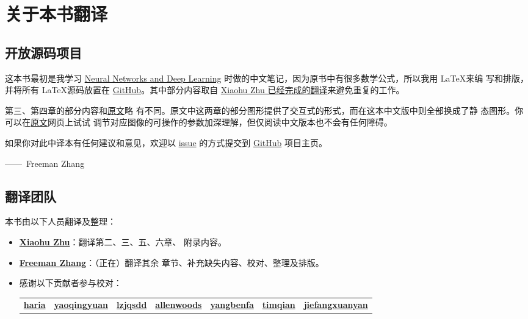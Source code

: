 
\chapter{关于本书翻译}
\label{ch:TranslationTeam}

\section*{开放源码项目}

这本书最初是我学习
\href{http://neuralnetworksanddeeplearning.com/index.html}{Neural Networks and
  Deep Learning} 时做的中文笔记，因为原书中有很多数学公式，所以我用 \LaTeX 来编
写和排版，并将所有 \LaTeX 源码放置在
\href{https://github.com/zhanggyb/nndl}{GitHub}。其中部分内容取自
\href{https://github.com/tigerneil/neural-networks-and-deep-learning-zh-cn}{Xiaohu
  Zhu 已经完成的翻译}来避免重复的工作。

第三、第四章的部分内容和\href{http://neuralnetworksanddeeplearning.com}{原文}略
有不同。原文中这两章的部分图形提供了交互式的形式，而在这本中文版中则全部换成了静
态图形。你可以在\href{http://neuralnetworksanddeeplearning.com}{原文}网页上试试
调节对应图像的可操作的参数加深理解，但仅阅读中文版本也不会有任何障碍。

如果你对此中译本有任何建议和意见，欢迎以
\href{https://github.com/zhanggyb/nndl/issues}{issue} 的方式提交到
\href{https://github.com/zhanggyb/nndl}{GitHub} 项目主页。

\begin{flushright}
  ——~Freeman Zhang
\end{flushright}

\section*{翻译团队}
\label{sec:TranslationTeam}

本书由以下人员翻译及整理：

\begin{itemize}
\item \textbf{\href{mailto:xhzhu.nju@gmail}{Xiaohu Zhu}}：翻译第二、三、五、六章、
  附录内容。
\item \textbf{\href{mailto:zhanggyb@gmail.com}{Freeman Zhang}}：（正在）翻译其余
  章节、补充缺失内容、校对、整理及排版。
\item 感谢以下贡献者参与校对：\\
    \begin{tabular}{l l l l l l l}
      \bfseries\href{https://github.com/haria}{haria} 
      & \bfseries\href{https://github.com/yaoqingyuan}{yaoqingyuan}
      & \bfseries\href{https://github.com/lzjqsdd}{lzjqsdd}
      & \bfseries\href{https://github.com/allenwoods}{allenwoods}
      & \bfseries\href{https://github.com/yangbenfa}{yangbenfa}
      & \bfseries\href{https://github.com/timqian}{timqian}
      & \bfseries\href{https://github.com/jiefangxuanyan}{jiefangxuanyan} \\
    \end{tabular}
\end{itemize}
